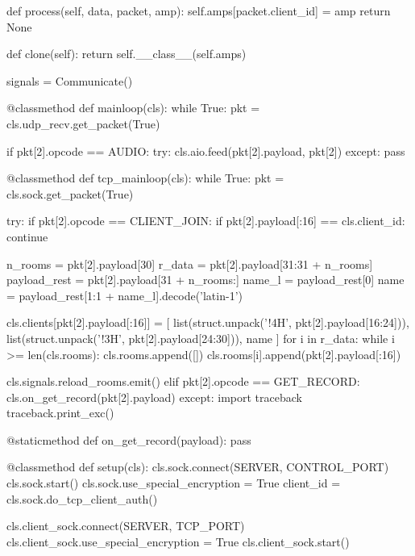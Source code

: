 \begin{pythoncode}
        def process(self, data, packet, amp):
            self.amps[packet.client_id] = amp
            return None

        def clone(self):
            return self.__class__(self.amps)

    signals = Communicate()

    @classmethod
    def mainloop(cls):
        while True:
            pkt = cls.udp_recv.get_packet(True)

            if pkt[2].opcode == AUDIO:
                try:
                    cls.aio.feed(pkt[2].payload, pkt[2])
                except:
                    pass

    @classmethod
    def tcp_mainloop(cls):
        while True:
            pkt = cls.sock.get_packet(True)

            try:
                if pkt[2].opcode == CLIENT_JOIN:
                    if pkt[2].payload[:16] == cls.client_id:
                        continue

                    n_rooms = pkt[2].payload[30]
                    r_data = pkt[2].payload[31:31 + n_rooms]
                    payload_rest = pkt[2].payload[31 + n_rooms:]
                    name_l = payload_rest[0]
                    name = payload_rest[1:1 + name_l].decode('latin-1')

                    cls.clients[pkt[2].payload[:16]] = [
                        list(struct.unpack('!4H', pkt[2].payload[16:24])),
                        list(struct.unpack('!3H', pkt[2].payload[24:30])),
                        name
                    ]
                    for i in r_data:
                        while i >= len(cls.rooms):
                            cls.rooms.append([])
                        cls.rooms[i].append(pkt[2].payload[:16])

                    cls.signals.reload_rooms.emit()
                elif pkt[2].opcode == GET_RECORD:
                    cls.on_get_record(pkt[2].payload)
            except:
                import traceback
                traceback.print_exc()
            
    @staticmethod
    def on_get_record(payload):
        pass

    @classmethod
    def setup(cls):
        cls.sock.connect(SERVER, CONTROL_PORT)
        cls.sock.start()
        cls.sock.use_special_encryption = True
        client_id = cls.sock.do_tcp_client_auth()

        cls.client_sock.connect(SERVER, TCP_PORT)
        cls.client_sock.use_special_encryption = True
        cls.client_sock.start()


\end{pythoncode}
